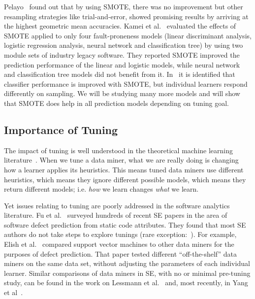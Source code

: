 \documentclass[sigconf,review, anonymous]{acmart}
\theoremstyle{break}
\theoremstyle{break}
\begin{document}
Pelayo~\cite{pelayo2007applying} found out that by using SMOTE, there was no improvement but other resampling strategies like trial-and-error, showed promising results by arriving at the highest geometric mean accuracies. Kamei et al.~\cite{kamei2007effects} evaluated the effects of SMOTE applied to only four fault-proneness models
(linear discriminant analysis, logistic regression
analysis, neural network and classification tree) by
using two module sets of industry legacy software. They reported SMOTE improved the prediction performance of the linear and logistic models, while neural network and classification tree models did not
benefit from it. In~\cite{van2007experimental} it is identified that classifier performance is improved with SMOTE, but individual learners respond differently on sampling. We will be studying many more models and will show that SMOTE does help in all prediction models depending on tuning goal.

\subsection{Importance of Tuning}
\label{sect:tune}

The impact of tuning is well understood in the theoretical machine learning literature~\cite{bergstra2012random}.  When we tune a
data miner, what we are really doing is changing how a learner applies its
heuristics. This means tuned data miners use different heuristics, which means
they ignore different possible models, which means they return different models;
i.e. \textit{how} we learn changes \textit{what} we learn.

Yet issues relating to
tuning are poorly addressed in the software analytics literature. Fu et al.~\cite{fu2016tuning} surveyed hundreds of recent SE papers in the area
of software defect prediction from static code attributes. They found that most SE
  authors do not take steps to explore tunings (rare exception:~\cite{tantithamthavorn2016icse}). For example, Elish et
  al.~\cite{elish2008predicting} compared support vector machines to other data
  miners for the purposes of defect prediction. That paper tested different
  ``off-the-shelf'' data miners on the same data set, without adjusting the
  parameters of each individual learner. Similar comparisons of data miners in SE,
with no or minimal pre-tuning study, can be found in the work on Lessmann et al.~\cite{4527256}
and, most recently, in Yang et al~\cite{Yang:2016}.  
\end{document}
